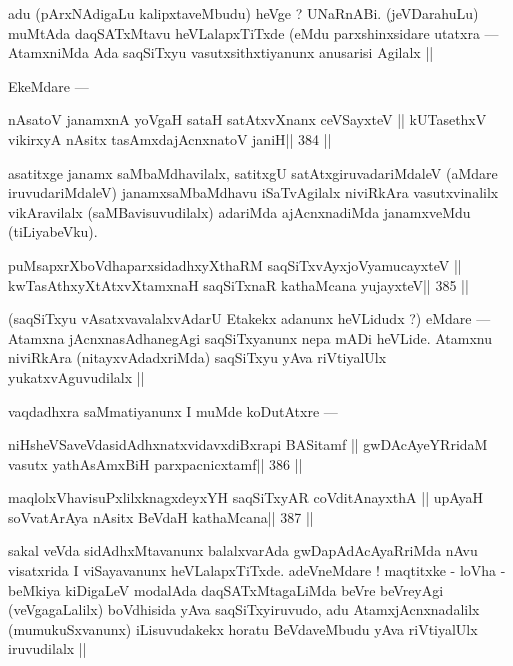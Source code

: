 \begin{artha}
adu (pArxNAdigaLu kalipxtaveMbudu) heVge ? UNaRnABi. (jeVDarahuLu) muMtAda daqSATxMtavu heVLalapxTiTxde (eMdu parxshinxsidare utatxra --- AtamxniMda Ada saqSiTxyu vasutxsithxtiyanunx anusarisi Agilalx ||
\end{artha}

\begin{artha}
EkeMdare ---
\end{artha}

\begin{shl}
nAsatoV janamxnA yoVgaH sataH satAtxvXnanx ceVSayxteV ||
kUTasethxV vikirxyA nAsitx tasAmxdajAcnxnatoV janiH\hfill || 384 ||
\end{shl}

\begin{artha}
asatitxge janamx saMbaMdhavilalx, satitxgU satAtxgiruvadariMdaleV (aMdare iruvudariMdaleV) janamxsaMbaMdhavu iSaTvAgilalx niviRkAra vasutxvinalilx vikAravilalx (saMBavisuvudilalx) adariMda ajAcnxnadiMda janamxveMdu (tiLiyabeVku).
\end{artha}

\begin{shl}
puMsapxrXboVdhaparxsidadhxyXthaRM saqSiTxvAyxjoV\s yamucayxteV ||
kwTasAthxyXtAtxvXtamxnaH saqSiTxnaR kathaMcana yujayxteV\hfill || 385 ||
\end{shl}

(saqSiTxyu vAsatxvavalalxvAdarU Etakekx adanunx heVLidudx ?) eMdare --- Atamxna jAcnxnasAdhanegAgi saqSiTxyanunx nepa mADi heVLide. Atamxnu niviRkAra (nitayxvAdadxriMda) saqSiTxyu yAva riVtiyalUlx yukatxvAguvudilalx ||

\begin{artha}
vaqdadhxra saMmatiyanunx I muMde koDutAtxre ---
\end{artha}

\begin{shl}
niHsheVSaveVdasidAdhxnatxvidavxdiBxrapi BASitamf ||
gwDAcAyeYRridaM vasutx yathA\s sAmxBiH parxpacnicxtamf\hfill || 386 ||
\end{shl}

\begin{shl}
maqlolxVhavisuPxlilxknagxdeyxYH saqSiTxyAR coVditA\s nayxthA ||
upAyaH soV\s vatArAya nAsitx BeVdaH kathaMcana\hfill || 387 ||
\end{shl}

\begin{artha}
sakal veVda sidAdhxMtavanunx balalxvarAda gwDapAdAcAyaRriMda nAvu visatxrida I viSayavanunx heVLalapxTiTxde. adeVneMdare ! maqtitxke - loVha - beMkiya kiDigaLeV modalAda daqSATxMtagaLiMda beVre beVreyAgi (veVgagaLalilx) boVdhisida yAva saqSiTxyiruvudo, adu AtamxjAcnxnadalilx (mumukuSxvanunx) iLisuvudakekx horatu BeVdaveMbudu yAva riVtiyalUlx iruvudilalx ||
\end{artha}


